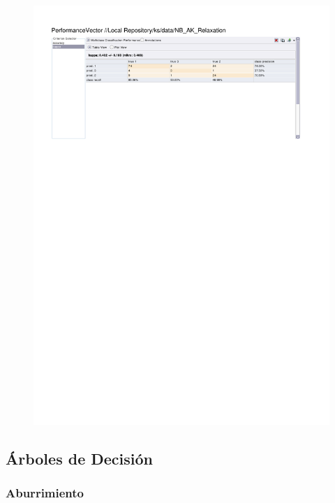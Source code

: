\begin{figure}[htp]
  \centerline{\includegraphics[trim=0 680 0 60,clip,width=16.09cm]{results/NB_K_Relaxation.pdf}} \caption{
} \label{NB_K_Relaxation}
\end{figure}

\clearpage
\FloatBarrier
\subsection{Árboles de Decisión}
\subsubsection{Aburrimiento}


